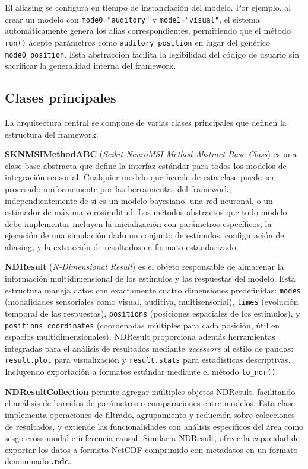 El aliasing se configura en tiempo de instanciación del modelo. Por ejemplo, al crear un modelo con \texttt{mode0="auditory"} y \texttt{mode1="visual"}, el sistema automáticamente genera los alias correspondientes, permitiendo que el método \texttt{run()} acepte parámetros como \texttt{auditory\_position} en lugar del genérico \texttt{mode0\_position}. Esta abstracción facilita la legibilidad del código de usuario sin sacrificar la generalidad interna del framework.


\subsection{Clases principales}
\label{subsec:snmsi_clases}

La arquitectura central se compone de varias clases principales que definen la estructura del framework:

\textbf{SKNMSIMethodABC} (\textit{Scikit-NeuroMSI Method Abstract Base Class}) es una clase base abstracta que define la interfaz estándar para todos los modelos de integración sensorial. Cualquier modelo que herede de esta clase puede ser procesado uniformemente por las herramientas del framework, independientemente de si es un modelo bayesiano, una red neuronal, o un estimador de máxima verosimilitud. Los métodos abstractos que todo modelo debe implementar incluyen la inicialización con parámetros específicos, la ejecución de una simulación dado un conjunto de estímulos, configuración de aliasing, y la extracción de resultados en formato estandarizado.

\textbf{NDResult} (\textit{N-Dimensional Result}) es el objeto responsable de almacenar la información multidimensional de los estímulos y las respuestas del modelo. Esta estructura maneja datos con exactamente cuatro dimensiones predefinidas: \texttt{modes} (modalidades sensoriales como visual, auditiva, multisensorial), \texttt{times} (evolución temporal de las respuestas), \texttt{positions} (posiciones espaciales de los estímulos), y \texttt{positions\_coordinates} (coordenadas múltiples para cada posición, útil en espacios multidimensionales). 
NDResult proporciona además herramientas integradas para el análisis de resultados mediante \textit{accessors} al estilo de pandas: \texttt{result.plot} para visualización y \texttt{result.stats} para estadísticas descriptivas. Incluyendo exportación a formatos estándar mediante el método \texttt{to\_ndr()}.

\textbf{NDResultCollection} permite agregar múltiples objetos NDResult, facilitando el análisis de barridos de parámetros o comparaciones entre modelos. Esta clase implementa operaciones de filtrado, agrupamiento y reducción sobre colecciones de resultados, y extiende las funcionalidades con análisis específicos del área como sesgo cross-modal e inferencia causal. Similar a NDResult, ofrece la capacidad de exportar los datos a formato NetCDF comprimido con metadatos en un formato denominado \textbf{.ndc}.


